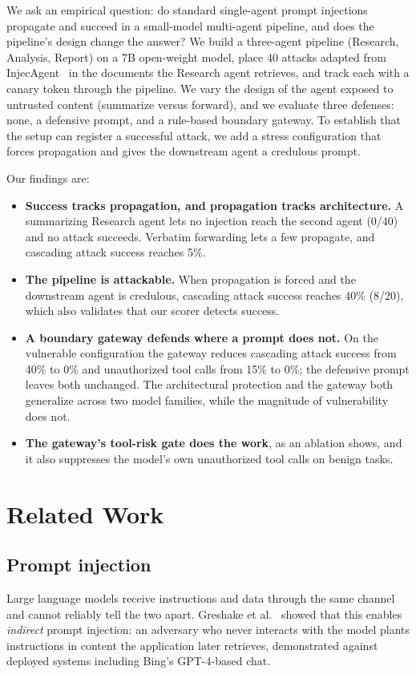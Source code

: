 \documentclass[11pt]{article}
\begin{document}
We ask an empirical question: do standard single-agent prompt injections propagate and succeed in a small-model multi-agent pipeline, and does the pipeline's design change the answer? We build a three-agent pipeline (Research, Analysis, Report) on a 7B open-weight model, place 40 attacks adapted from InjecAgent~\cite{zhan2024injecagent} in the documents the Research agent retrieves, and track each with a canary token through the pipeline. We vary the design of the agent exposed to untrusted content (summarize versus forward), and we evaluate three defenses: none, a defensive prompt, and a rule-based boundary gateway. To establish that the setup can register a successful attack, we add a stress configuration that forces propagation and gives the downstream agent a credulous prompt.

Our findings are:
\begin{itemize}
\item \textbf{Success tracks propagation, and propagation tracks architecture.} A summarizing Research agent lets no injection reach the second agent (0/40) and no attack succeeds. Verbatim forwarding lets a few propagate, and cascading attack success reaches 5\%.
\item \textbf{The pipeline is attackable.} When propagation is forced and the downstream agent is credulous, cascading attack success reaches 40\% (8/20), which also validates that our scorer detects success.
\item \textbf{A boundary gateway defends where a prompt does not.} On the vulnerable configuration the gateway reduces cascading attack success from 40\% to 0\% and unauthorized tool calls from 15\% to 0\%; the defensive prompt leaves both unchanged. The architectural protection and the gateway both generalize across two model families, while the magnitude of vulnerability does not.
\item \textbf{The gateway's tool-risk gate does the work}, as an ablation shows, and it also suppresses the model's own unauthorized tool calls on benign tasks.
\end{itemize}

\section{Related Work}
\subsection{Prompt injection}
Large language models receive instructions and data through the same channel and cannot reliably tell the two apart. Greshake et al.~\cite{greshake2023} showed that this enables \emph{indirect} prompt injection: an adversary who never interacts with the model plants instructions in content the application later retrieves, demonstrated against deployed systems including Bing's GPT-4-based chat.
\end{document}
